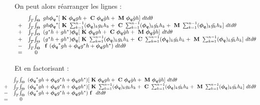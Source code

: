 On peut alors réarranger les lignes :
\begin{equation}
\begin{array}{r r l}
	&\int_T \! \int_\Theta \!\!\!&		
		gh\boldsymbol{\phi_q}^*[~\mathbf{K}~\boldsymbol{\phi_q} gh + ~\mathbf{C}~ \boldsymbol{\phi_q}  \dot{g}h 
				+ ~\mathbf{M}~ \boldsymbol{\phi_q} \ddot{g}h
				] ~dt d\theta
	\\
	+ &\int_T \! \int_\Theta \!\!\!&		
		gh\boldsymbol{\phi_q}^*[  ~\mathbf{K}~ \sum_{k=1}^{n-1} (\boldsymbol{\phi_q})_k       g_k  h_k 
				+ ~\mathbf{C}~ \sum_{k=1}^{n-1} (\boldsymbol{\phi_q})_k  \dot{g_k} h_k 
				+ ~\mathbf{M}~ \sum_{k=1}^{n-1} (\boldsymbol{\phi_q})_k \ddot{g_k} h_k 
				] ~dt d\theta
	\\
	+ &\int_T \! \int_\Theta \!\!\!&		
		(g^*h + gh^*)\boldsymbol{\phi_q}[~\mathbf{K}~ \boldsymbol{\phi_q}gh
						+ ~\mathbf{C}~ \boldsymbol{\phi_q} \dot{g}h 
						+ ~\mathbf{M}~ \boldsymbol{\phi_q} \ddot{g}h
						] ~dt d\theta
	\\
	+ &\int_T \! \int_\Theta \!\!\!&
		(g^*h + gh^*)\boldsymbol{\phi_q}[ ~\mathbf{K}~ \sum_{k=1}^{n-1} (\boldsymbol{\phi_q})_k       g_k  h_k 
						+ ~\mathbf{C}~ \sum_{k=1}^{n-1} (\boldsymbol{\phi_q})_k  \dot{g_k} h_k 
						+ ~\mathbf{M}~ \sum_{k=1}^{n-1} (\boldsymbol{\phi_q})_k \ddot{g_k} h_k 
						] ~dt d\theta
	\\
	- &\int_T \! \int_\Theta \!\!\!&
		~\mathbf{f}~ (\boldsymbol{\phi_q}^*gh + \boldsymbol{\phi_q} g^*h + \boldsymbol{\phi_q} gh^*) ~dt d\theta
	\\
	= &0& 
\end{array}
\end{equation}

Et en factorisant :
\begin{equation}
\!\!\!\!\!\!\!\!\!\!\!\!\!\!\!\!
\begin{array}{r r l}
	&\int_T \! \int_\Theta \!\!\!&		
		(\boldsymbol{\phi_q}^*gh + \boldsymbol{\phi_q}g^*h + \boldsymbol{\phi_q}gh^*)[~\mathbf{K}~ \boldsymbol{\phi_q}gh
						+ ~\mathbf{C}~ \boldsymbol{\phi_q} \dot{g}h 
						+ ~\mathbf{M}~ \boldsymbol{\phi_q} \ddot{g}h
						] ~dt d\theta
	\\
	+ &\int_T \! \int_\Theta \!\!\!&
		(\boldsymbol{\phi_q}^*gh + \boldsymbol{\phi_q}g^*h + \boldsymbol{\phi_q}gh^*)
			[ ~\mathbf{K}~ \sum_{k=1}^{n-1} (\boldsymbol{\phi_q})_k       g_k  h_k
			+ ~\mathbf{C}~ \sum_{k=1}^{n-1} (\boldsymbol{\phi_q})_k  \dot{g_k} h_k 
			+ ~\mathbf{M}~ \sum_{k=1}^{n-1} (\boldsymbol{\phi_q})_k \ddot{g_k} h_k 
			] ~dt d\theta
	\\
	- &\int_T \! \int_\Theta \!\!\!&
		(\boldsymbol{\phi_q}^*gh + \boldsymbol{\phi_q} g^*h + \boldsymbol{\phi_q} gh^*) ~\mathbf{f}~ ~dt d\theta
	\\
	= &0& 
\end{array}
\end{equation}

